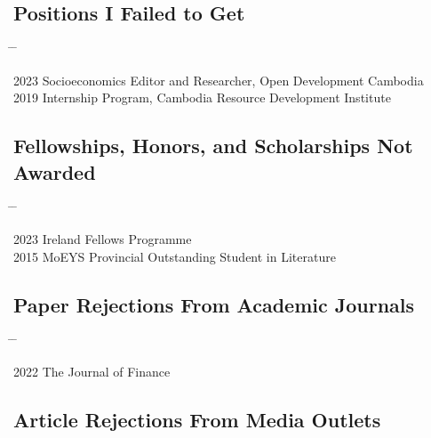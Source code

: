 \documentclass[10pt,a4paper]{article}
\newcommand{\tabbedblock}[1]{

	\begin{tabbing}
		\hspace{2cm} \= \hspace{4cm} \= \kill
		#1
	\end{tabbing}
}
\begin{document}
\subsection*{Positions I Failed to Get} 
	\tabbedblock{
		2023 \> Socioeconomics Editor and Researcher, Open Development Cambodia \\ 
		2019 \> Internship Program, Cambodia Resource Development Institute
	}
\subsection*{Fellowships, Honors, and Scholarships Not Awarded}

\tabbedblock{
	2023 \> Ireland Fellows Programme \\
	2015 \> MoEYS Provincial Outstanding Student in Literature

}


\subsection*{Paper Rejections From Academic Journals}

\tabbedblock{
	2022 \> The Journal of Finance
	
}

\subsection*{Article Rejections From Media Outlets}
\end{document}
